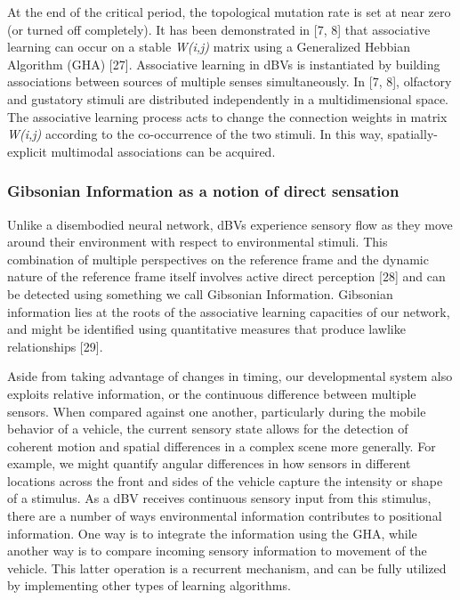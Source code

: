 \documentclass{article}
\begin{document}
At the end of the critical period, the topological mutation rate is set at near zero (or turned off completely). It has been demonstrated in [7, 8] that associative learning can occur on a stable {\it W(i,j)} matrix using a Generalized Hebbian Algorithm (GHA) [27]. Associative learning in dBVs is instantiated by building associations between sources of multiple senses simultaneously. In [7, 8], olfactory and gustatory stimuli are distributed independently in a multidimensional space. The associative learning process acts to change the connection weights in matrix {\it W(i,j)} according to the co-occurrence of the two stimuli. In this way, spatially-explicit multimodal associations can be acquired. 

\subsubsection*{Gibsonian Information as a notion of direct sensation}

Unlike a disembodied neural network, dBVs experience sensory flow as they move around their environment with respect to environmental stimuli. This combination of multiple perspectives on the reference frame and the dynamic nature of the reference frame itself involves active direct perception [28] and can be detected using something we call Gibsonian Information. Gibsonian information lies at the roots of the associative learning capacities of our network, and might be identified using quantitative measures that produce lawlike relationships [29]. 

Aside from taking advantage of changes in timing, our developmental system also exploits relative information, or the continuous difference between multiple sensors. When compared against one another, particularly during the mobile behavior of a vehicle, the current sensory state allows for the detection of coherent motion and spatial differences in a complex scene more generally. For example, we might quantify angular differences in how sensors in different locations across the front and sides of the vehicle capture the intensity or shape of a stimulus.  As a dBV receives continuous sensory input from this stimulus, there are a number of ways environmental information contributes to positional information. One way is to integrate the information using the GHA, while another way is to compare incoming sensory information to movement of the vehicle. This latter operation is a recurrent mechanism, and can be fully utilized by implementing other types of learning algorithms.
\end{document}
